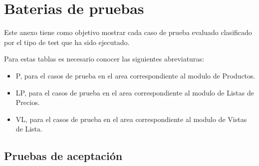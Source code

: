 \chapter{Baterias de pruebas}
Este anexo tiene como objetivo mostrar cada caso de prueba evaluado clasificado
por el tipo de test que ha sido ejecutado.

Para estas tablas es necesario conocer las siguientes abreviaturas:

\begin{itemize}
\item P, para el casos de prueba en el area correspondiente al modulo de Productos.
\item LP, para el casos de prueba en el area correspondiente al modulo de Listas de Precios.
\item VL, para el casos de prueba en el area correspondiente al modulo de Vistas de Lista.
\end{itemize}

\section{Pruebas de aceptación}

